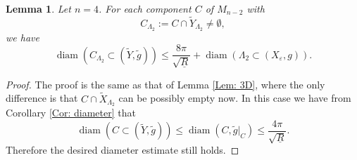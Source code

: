 \documentclass[11pt,letterpaper]{amsart}
\numberwithin{equation}{section}
\newtheorem{lemma}[theorem]{Lemma}
\theoremstyle{definition}
\DeclareMathOperator{\diam}{diam}
\newcommand{\ve}{\varepsilon}
\begin{document}
\begin{lemma}\label{Lem: 4D}
Let $n=4$. For each component $C$ of $M_{n-2}$ with
$$C_{\Lambda_2}:=C\cap\tilde Y_{\Lambda_2}\neq \emptyset,$$
we have
$$
\diam(C_{\Lambda_2}\subset (\tilde Y,\tilde g))\leq \frac{8\pi}{\sqrt{\underline R}}+\diam(\Lambda_2\subset(X_\ve,g)).
$$
\end{lemma}
\begin{proof}
The proof is the same as that of Lemma \ref{Lem: 3D}, where the only difference is that $C\cap \tilde X_{\Lambda_2}$ can be possibly empty now. In this case we have from Corollary \ref{Cor: diameter} that
$$
\diam(C\subset (\tilde Y,\tilde g))\leq \diam(C,\tilde{g}|_C)\leq \frac{4\pi}{\sqrt{\underline R}}.
$$
Therefore the desired diameter estimate still holds.
\end{proof}
\end{document}
